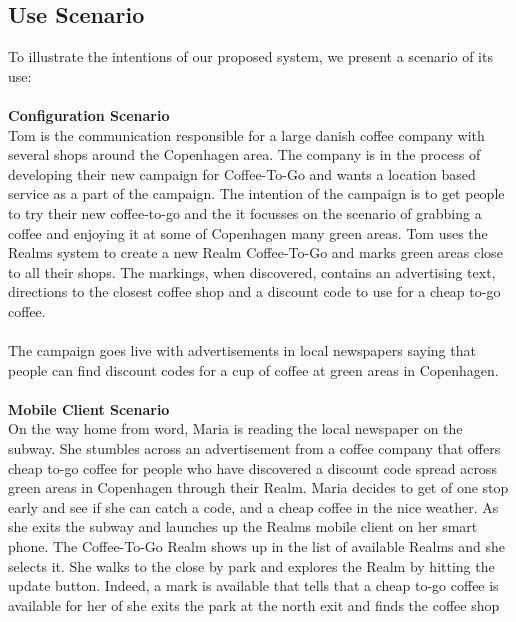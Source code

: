 \subsection{Use Scenario} %
\label{sub:scenario}
To illustrate the intentions of our proposed system, we present a scenario of its use:
\\\\
\textbf{Configuration Scenario}\\
Tom is the communication responsible for a large danish coffee company with several shops around the Copenhagen area. The company is in the process of developing their new campaign for Coffee-To-Go and wants a location based service as a part of the campaign. The intention of the campaign is to get people to try their new coffee-to-go and the it focusses on the scenario of grabbing a coffee and enjoying it at some of Copenhagen many green areas. Tom uses the Realms system to create a new Realm Coffee-To-Go and marks green areas close to all their shops. The markings, when discovered, contains an advertising text, directions to the closest coffee shop and a discount code to use for a cheap to-go coffee.
\\\\
The campaign goes live with advertisements in local newspapers saying that people can find discount codes for a cup of coffee at green areas in Copenhagen. 
\\\\
\textbf{Mobile Client Scenario}\\
On the way home from word, Maria is reading the local newspaper on the subway. She stumbles across an advertisement from a coffee company that offers cheap to-go coffee for people who have discovered a discount code spread across green areas in Copenhagen through their Realm. Maria decides to get of one stop early and see if she can catch a code, and a cheap coffee in the nice weather. As she exits the subway and launches up the Realms mobile client on her smart phone. The Coffee-To-Go Realm shows up in the list of available Realms and she selects it. She walks to the close by park and explores the Realm by hitting the update button. Indeed, a mark is available that tells that a cheap to-go coffee is available for her of she exits the park at the north exit and finds the coffee shop 


